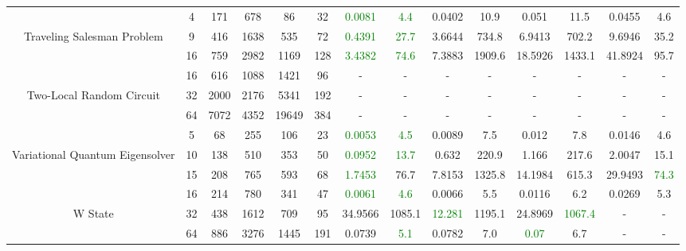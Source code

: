 \begin{table}[htb]
{\begin{tabular}{|c|c|c|c|c|c|c|c|c|c|c|c|c|c|}
\hline
 & 
4 & 171 & 678 & 86 & 32
 & \textcolor{green}{0.0081} & \textcolor{green}{4.4}
 & 0.0402 & 10.9
 & 0.051 & 11.5
 & 0.0455 & 4.6
 \\
Traveling Salesman Problem & 
9 & 416 & 1638 & 535 & 72
 & \textcolor{green}{0.4391} & \textcolor{green}{27.7}
 & 3.6644 & 734.8
 & 6.9413 & 702.2
 & 9.6946 & 35.2
 \\
 & 
16 & 759 & 2982 & 1169 & 128
 & \textcolor{green}{3.4382} & \textcolor{green}{74.6}
 & 7.3883 & 1909.6
 & 18.5926 & 1433.1
 & 41.8924 & 95.7
 \\
\hline
 & 
16 & 616 & 1088 & 1421 & 96
 & - & -
 & - & -
 & - & -
 & - & -
 \\
Two-Local Random Circuit & 
32 & 2000 & 2176 & 5341 & 192
 & - & -
 & - & -
 & - & -
 & - & -
 \\
 & 
64 & 7072 & 4352 & 19649 & 384
 & - & -
 & - & -
 & - & -
 & - & -
 \\
\hline
 & 
5 & 68 & 255 & 106 & 23
 & \textcolor{green}{0.0053} & \textcolor{green}{4.5}
 & 0.0089 & 7.5
 & 0.012 & 7.8
 & 0.0146 & 4.6
 \\
Variational Quantum Eigensolver & 
10 & 138 & 510 & 353 & 50
 & \textcolor{green}{0.0952} & \textcolor{green}{13.7}
 & 0.632 & 220.9
 & 1.166 & 217.6
 & 2.0047 & 15.1
 \\
 & 
15 & 208 & 765 & 593 & 68
 & \textcolor{green}{1.7453} & 76.7
 & 7.8153 & 1325.8
 & 14.1984 & 615.3
 & 29.9493 & \textcolor{green}{74.3}
 \\
\hline
 & 
16 & 214 & 780 & 341 & 47
 & \textcolor{green}{0.0061} & \textcolor{green}{4.6}
 & 0.0066 & 5.5
 & 0.0116 & 6.2
 & 0.0269 & 5.3
 \\
W State & 
32 & 438 & 1612 & 709 & 95
 & 34.9566 & 1085.1
 & \textcolor{green}{12.281} & 1195.1
 & 24.8969 & \textcolor{green}{1067.4}
 & - & -
 \\
 & 
64 & 886 & 3276 & 1445 & 191
 & 0.0739 & \textcolor{green}{5.1}
 & 0.0782 & 7.0
 & \textcolor{green}{0.07} & 6.7
 & - & -
 \\
\hline
\end{tabular}}
\end{table}